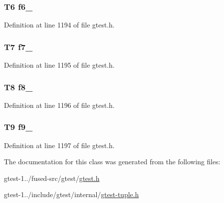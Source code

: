 \hypertarget{classstd_1_1tr1_1_1tuple_a597448bec664cd26fd4418b3b53fa339}{
\subsubsection[{f6\-\_\-}]{\setlength{\rightskip}{0pt plus 5cm}\-T6 {\bf f6\-\_\-}}}\label{d7/d6d/classstd_1_1tr1_1_1tuple_a597448bec664cd26fd4418b3b53fa339}


\-Definition at line 1194 of file gtest.\-h.

\hypertarget{classstd_1_1tr1_1_1tuple_adad604e2e34188f7ede1195892853834}{
\subsubsection[{f7\-\_\-}]{\setlength{\rightskip}{0pt plus 5cm}\-T7 {\bf f7\-\_\-}}}\label{d7/d6d/classstd_1_1tr1_1_1tuple_adad604e2e34188f7ede1195892853834}


\-Definition at line 1195 of file gtest.\-h.

\hypertarget{classstd_1_1tr1_1_1tuple_a4adb86b35d375c2a181eec5b01ad7c39}{
\subsubsection[{f8\-\_\-}]{\setlength{\rightskip}{0pt plus 5cm}\-T8 {\bf f8\-\_\-}}}\label{d7/d6d/classstd_1_1tr1_1_1tuple_a4adb86b35d375c2a181eec5b01ad7c39}


\-Definition at line 1196 of file gtest.\-h.

\hypertarget{classstd_1_1tr1_1_1tuple_a0aa6a1fc824cbe3463a2c6d99415ca6c}{
\subsubsection[{f9\-\_\-}]{\setlength{\rightskip}{0pt plus 5cm}\-T9 {\bf f9\-\_\-}}}\label{d7/d6d/classstd_1_1tr1_1_1tuple_a0aa6a1fc824cbe3463a2c6d99415ca6c}


\-Definition at line 1197 of file gtest.\-h.



\-The documentation for this class was generated from the following files\-:\begin{DoxyCompactItemize}
\item 
gtest-\/1../fused-\/src/gtest/\hyperlink{fused-src_2gtest_2gtest_8h}{gtest.\-h}\item 
gtest-\/1../include/gtest/internal/\hyperlink{gtest-tuple_8h}{gtest-\/tuple.\-h}\end{DoxyCompactItemize}
